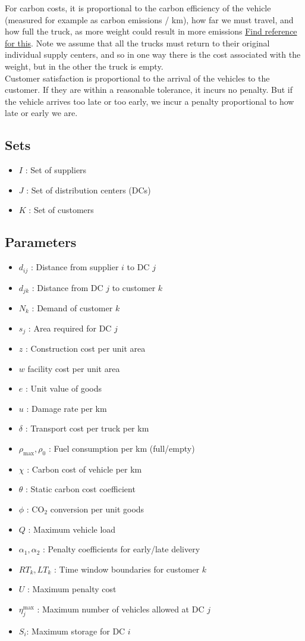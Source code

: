 \documentclass[conference]{IEEEtran}
\begin{document}
For carbon costs, it is proportional to the carbon efficiency of the vehicle (measured for example as carbon emissions / km), how far we must travel, and how full the truck, as more weight could result in more emissions \underline{Find reference for this}. Note we assume that all the trucks must return to their original individual supply centers, and so in one way there is the cost associated with the weight, but in the other the truck is empty.\\
Customer satisfaction is proportional to the arrival of the vehicles to the customer. If they are within a reasonable tolerance, it incurs no penalty. But if the vehicle arrives too late or too early, we incur a penalty proportional to how late or early we are.
\subsection*{Sets}
\begin{itemize}
    \item $I$ : Set of suppliers
    \item $J$ : Set of distribution centers (DCs)
    \item $K$ : Set of customers
\end{itemize}

\subsection*{Parameters}
\begin{itemize}
    \item $d_{ij}$ : Distance from supplier $i$ to DC $j$
    \item $d_{jk}$ : Distance from DC $j$ to customer $k$
    \item $N_k$ : Demand of customer $k$
    \item $s_j$ : Area required for DC $j$
    \item $z$ : Construction cost per unit area
    \item $w$ facility cost per unit area
    \item $e$ : Unit value of goods
    \item $u$ : Damage rate per km
    \item $\delta$ : Transport cost per truck per km
    \item $\rho_{\max}, \rho_0$ : Fuel consumption per km (full/empty)
    \item $\chi$ : Carbon cost of vehicle per km
    \item $\theta$ : Static carbon cost coefficient
    \item $\phi$ : CO$_2$ conversion per unit goods
    \item $Q$ : Maximum vehicle load
    \item $\alpha_1, \alpha_2$ : Penalty coefficients for early/late delivery
    \item $RT_k, LT_k$ : Time window boundaries for customer $k$
    \item $U$ : Maximum penalty cost
    \item $\eta^{\max}_j$ : Maximum number of vehicles allowed at DC $j$
    \item $S_i$: Maximum storage for DC $i$
\end{itemize}
\end{document}
